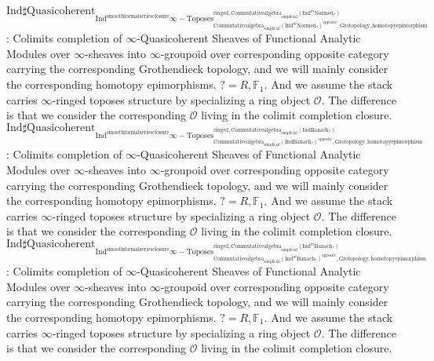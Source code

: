 \documentclass[11pt]{book}
\theoremstyle{definition}
\numberwithin{equation}{section}
\begin{document}
\noindent $\mathrm{Ind}\mathrm{\sharp Quasicoherent}_{\mathrm{Ind}^\text{smoothformalseriesclosure}\infty-\mathrm{Toposes}^{\mathrm{ringed},\mathrm{Commutativealgebra}_{\mathrm{simplicial}}(\mathrm{Ind}^m\mathrm{Normed}_?)}_{\mathrm{Commutativealgebra}_{\mathrm{simplicial}}(\mathrm{Ind}^m\mathrm{Normed}_?)^\mathrm{opposite},\mathrm{Grotopology,homotopyepimorphism}}}$: Colimits completion of $\infty$-Quasicoherent Sheaves of Functional Analytic Modules over $\infty$-sheaves into $\infty$-groupoid over corresponding opposite category carrying the corresponding Grothendieck topology, and we will mainly consider the corresponding homotopy epimorphisms. $?=R,\mathbb{F}_1$. And we assume the stack carries $\infty$-ringed toposes structure by specializing a ring object $\mathcal{O}$. The difference is that we consider the corresponding $\mathcal{O}$ living in the colimit completion closure.\\
\noindent $\mathrm{Ind}\mathrm{\sharp Quasicoherent}_{\mathrm{Ind}^\text{smoothformalseriesclosure}\infty-\mathrm{Toposes}^{\mathrm{ringed},\mathrm{Commutativealgebra}_{\mathrm{simplicial}}(\mathrm{Ind}\mathrm{Banach}_?)}_{\mathrm{Commutativealgebra}_{\mathrm{simplicial}}(\mathrm{Ind}\mathrm{Banach}_?)^\mathrm{opposite},\mathrm{Grotopology,homotopyepimorphism}}}$: Colimits completion of $\infty$-Quasicoherent Sheaves of Functional Analytic Modules over $\infty$-sheaves into $\infty$-groupoid over corresponding opposite category carrying the corresponding Grothendieck topology, and we will mainly consider the corresponding homotopy epimorphisms. $?=R,\mathbb{F}_1$. And we assume the stack carries $\infty$-ringed toposes structure by specializing a ring object $\mathcal{O}$. The difference is that we consider the corresponding $\mathcal{O}$ living in the colimit completion closure.\\
\noindent $\mathrm{Ind}\mathrm{\sharp Quasicoherent}_{\mathrm{Ind}^\text{smoothformalseriesclosure}\infty-\mathrm{Toposes}^{\mathrm{ringed},\mathrm{Commutativealgebra}_{\mathrm{simplicial}}(\mathrm{Ind}^m\mathrm{Banach}_?)}_{\mathrm{Commutativealgebra}_{\mathrm{simplicial}}(\mathrm{Ind}^m\mathrm{Banach}_?)^\mathrm{opposite},\mathrm{Grotopology,homotopyepimorphism}}}$: Colimits completion of $\infty$-Quasicoherent Sheaves of Functional Analytic Modules over $\infty$-sheaves into $\infty$-groupoid over corresponding opposite category carrying the corresponding Grothendieck topology, and we will mainly consider the corresponding homotopy epimorphisms. $?=R,\mathbb{F}_1$. And we assume the stack carries $\infty$-ringed toposes structure by specializing a ring object $\mathcal{O}$. The difference is that we consider the corresponding $\mathcal{O}$ living in the colimit completion closure.\\ 
\end{document}
